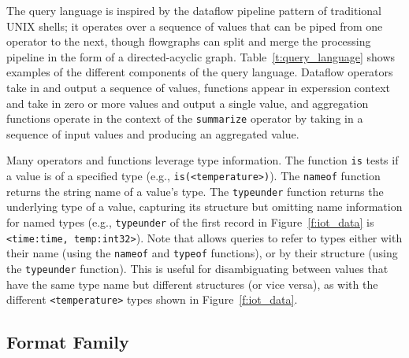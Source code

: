 The \sys{} query language is inspired by the dataflow pipeline pattern of traditional UNIX shells; it operates over a sequence of \sys{} values that can be piped from one operator to the next, though \Zed{} flowgraphs can split and merge the processing pipeline in the form of a directed-acyclic graph.  Table~\ref{t:query_language} shows examples of the different components of the \sys{} query language. Dataflow operators take in and output a sequence of \sys{} values, functions appear in experssion context and take in zero or more \sys{} values and output a single \sys{} value, and aggregation functions operate in the context of the \texttt{summarize} operator by taking in a sequence of input values and producing an aggregated value.

Many \sys{} operators and functions leverage type information. The function \texttt{is} tests if a value is of a specified type (e.g., \texttt{is(<temperature>)}). The \texttt{nameof} function returns the string name of a value's type. The \texttt{typeunder} function returns the underlying type of a value, capturing its structure but omitting name information for named types (e.g., \texttt{typeunder} of the first record in Figure~\ref{f:iot_data} is \texttt{<{time:time,} \texttt{temp:int32}>}). Note that \sys{} allows queries to refer to types either with their name (using the \texttt{nameof} and \texttt{typeof} functions), or by their structure (using the \texttt{typeunder} function). This is useful for disambiguating between values that have the same type name but different structures (or vice versa), as with the different \texttt{<temperature>} types shown in Figure~\ref{f:iot_data}.



\subsection{\sys{} Format Family} \label{ss:zed_formats}

